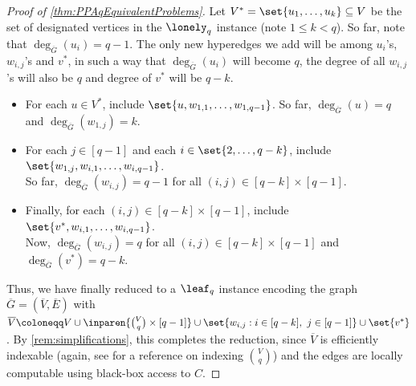 \begin{proof}[Proof of \autoref{thm:PPAqEquivalentProblems}]
Let $V^* = \set{u_1, \ldots, u_k} \subseteq V$ be the set of designated vertices in the $\lonely_q$ instance (note $1 \le k < q$). So far, note that $\deg_{\overline{G}}(u_i) = q-1$. The only new hyperedges we add will be among $u_i$'s, $w_{i,j}$'s and $v^*$, in such a way that $\deg_{\overline{G}}(u_i)$ will become $q$, the degree of all $w_{i,j}$'s will also be $q$ and degree of $v^*$ will be $q-k$.
\begin{itemize}[label=$\triangleright$, itemsep=3pt]
\item For each $u \in V^*$, include $\set{u, w_{1,1}, \ldots, w_{1,q-1}}$. So far, $\deg_{\overline{G}}(u) = q$ and $\deg_{\overline{G}}(w_{1,j}) = k$.
\item For each $j \in [q-1]$ and each $i \in \set{2, \ldots, q-k}$, include $\set{w_{1,j}, w_{i,1}, \ldots, w_{i,q-1}}$.\\
So far, $\deg_{\overline{G}}(w_{i,j}) = q-1$ for all $(i,j) \in [q-k] \times [q-1]$.
\item Finally, for each $(i,j) \in [q-k] \times [q-1]$, include $\set{v^*, w_{i,1}, \ldots, w_{i,q-1}}$.\\
Now, $\deg_{\overline{G}}(w_{i,j}) = q$ for all $(i,j) \in [q-k] \times [q-1]$ and $\deg_{\overline{G}}(v^*) = q-k$.
\end{itemize}

Thus, we have finally reduced to a $\leaf_q$ instance encoding the graph $\overline{G} = (\overline{V}, \overline{E})$ with $\overline{V} \coloneqq V \cup  \inparen{\binom{V}{q} \times [q-1]} \cup \set{w_{i,j} : i \in [q-k],\ j \in [q-1]} \cup \set{v^*}$. By \autoref{rem:simplifications}, this completes the reduction, since $\overline{V}$ is efficiently indexable (again, see \cite{r31} for a reference on indexing $\binom{V}{q}$) and the edges are locally computable using black-box access to $C$.
\end{proof}

